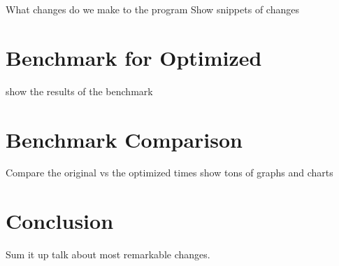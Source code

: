 \documentclass{article}
\begin{document}
What changes do we make to the program
Show snippets of changes

\section{Benchmark for Optimized}
show the results of the benchmark

\section{Benchmark Comparison}
Compare the original vs the optimized times
show tons of graphs and charts

\section{Conclusion}
Sum it up 
talk about most remarkable changes.
\end{document}
